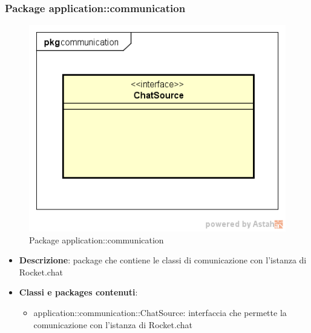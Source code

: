 \subsubsection{Package application::communication}
\label{Package application::communication}
\begin{figure}[H]
	\centering
	\includegraphics[scale=0.5]{Sezioni/Packages/Application/communication.png}
	\caption{Package application::communication}
\end{figure}
\begin{itemize}
	\item \textbf{Descrizione}: package che contiene le classi di comunicazione con l'istanza di Rocket.chat
	\item \textbf{Classi e packages contenuti}:
	\begin{itemize}
	\item application::communication::ChatSource: interfaccia che permette la comunicazione con l'istanza di Rocket.chat
	\end{itemize}
\end{itemize}

